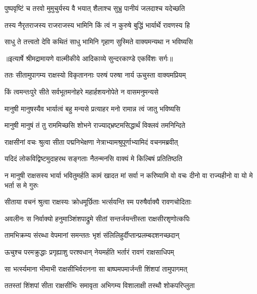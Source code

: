 \twolineshloka
{पुष्पवृष्टिं च तरवो मुमुचुर्यस्य वै भयात्}
{शैलाश्च सुभ्रु पानीयं जलदाश्च यदेच्छति} %

\twolineshloka
{तस्य नैरृतराजस्य राजराजस्य भामिनि}
{किं त्वं न कुरुषे बुद्धिं भार्यार्थे रावणस्य हि} %

\twolineshloka
{साधु ते तत्त्वतो देवि कथितं साधु भामिनि}
{गृहाण सुस्मिते वाक्यमन्यथा न भविष्यसि} %


{॥इत्यार्षे श्रीमद्रामायणे वाल्मीकीये आदिकाव्ये सुन्दरकाण्डे एकविंशः सर्गः॥}


\twolineshloka
{ततः सीतामुपागम्य राक्षस्यो विकृताननाः}
{परुषं परुषा नार्य ऊचुस्ता वाक्यमप्रियम्} %

\twolineshloka
{किं त्वमन्तःपुरे सीते सर्वभूतमनोहरे}
{महार्हशयनोपेते न वासमनुमन्यसे} %

\twolineshloka
{मानुषी मानुषस्यैव भार्यात्वं बहु मन्यसे}
{प्रत्याहर मनो रामान्न त्वं जातु भविष्यसि} %

\twolineshloka
{मानुषी मानुषं तं तु राममिच्छसि शोभने}
{राज्याद्भ्रष्टमसिद्धार्थं विक्लवं तमनिन्दिते} %

\twolineshloka
{राक्षसीनां वचः श्रुत्वा सीता पद्मनिभेक्षणा}
{नेत्राभ्यामश्रुपूर्णाभ्यामिदं वचनमब्रवीत्} %

\twolineshloka
{यदिदं लोकविद्विष्टमुदाहरथ सङ्गताः}
{नैतन्मनसि वाक्यं मे किल्बिषं प्रतितिष्ठति} %

\threelineshloka
{न मानुषी राक्षसस्य भार्या भवितुमर्हति}
{कामं खादत मां सर्वा न करिष्यामि वो वचः}
{दीनो वा राज्यहीनो वा यो मे भर्ता स मे गुरुः} %

\twolineshloka
{सीताया वचनं श्रुत्वा राक्षस्यः क्रोधमूर्छिताः}
{भर्त्सयन्ति स्म परुषैर्वाक्यै रावणचोदिताः} %

\twolineshloka
{अवलीनः स निर्वाक्यो हनुमाञ्शिंशपाद्रुमे}
{सीतां सन्तर्जयन्तीस्ता राक्षसीरशृणोत्कपिः} %

\twolineshloka
{तामभिक्रम्य संरब्धा वेपमानां समन्ततः}
{भृशं संलिलिहुर्दीप्तान्प्रलम्बदशनच्छदान्} %

\twolineshloka
{ऊचुश्च परमक्रुद्धाः प्रगृह्याशु परश्वधान्}
{नेयमर्हति भर्तारं रावणं राक्षसाधिपम्} %

\twolineshloka
{सा भर्त्स्यमाना भीमाभी राक्षसीभिर्वरानना}
{सा बाष्पमपमार्जन्ती शिंशपां तामुपागमत्} %

\twolineshloka
{ततस्तां शिंशपां सीता राक्षसीभिः समावृता}
{अभिगम्य विशालाक्षी तस्थौ शोकपरिप्लुता} %

